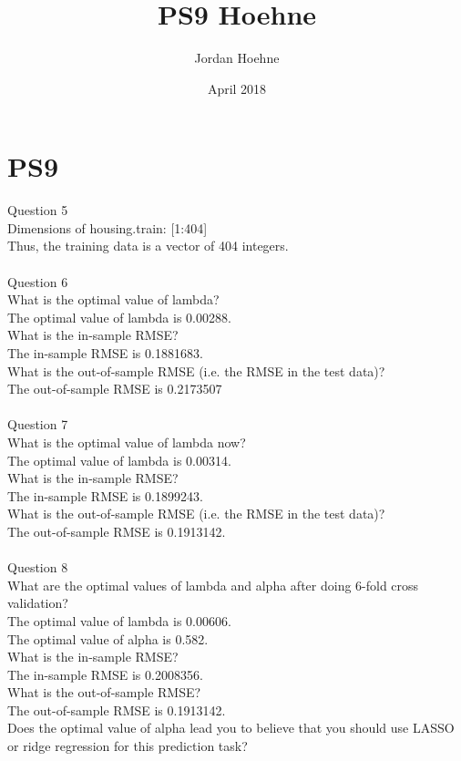 \documentclass{article}
\title{PS9 Hoehne}
\author{Jordan Hoehne}
\date{April 2018}
\begin{document}
\maketitle

\section{PS9}
Question 5\\
Dimensions of housing.train: [1:404] \\
Thus, the training data is a vector of 404 integers.\\
\\
Question 6\\
What is the optimal value of lambda?\\
The optimal value of lambda is 0.00288. \\
What is the in-sample RMSE?\\
The in-sample RMSE is 0.1881683. \\
What is the out-of-sample RMSE (i.e. the RMSE in the test data)?\\
The out-of-sample RMSE is 0.2173507 \\
\\
Question 7\\
What is the optimal value of lambda now?\\
The optimal value of lambda is 0.00314.\\
What is the in-sample RMSE?\\
The in-sample RMSE is 0.1899243.\\
What is the out-of-sample RMSE (i.e. the RMSE in the test data)?\\
The out-of-sample RMSE is 0.1913142.\\
\\
Question 8\\
What are the optimal values of lambda and alpha after doing 6-fold cross validation?\\
The optimal value of lambda is 0.00606. \\
The optimal value of alpha is 0.582. \\
What is the in-sample RMSE?\\
The in-sample RMSE is 0.2008356. \\
What is the out-of-sample RMSE?\\
The out-of-sample RMSE is 0.1913142.\\
Does the optimal value of alpha lead you to believe that you should use LASSO or ridge regression for this prediction task?\\
\end{document}
